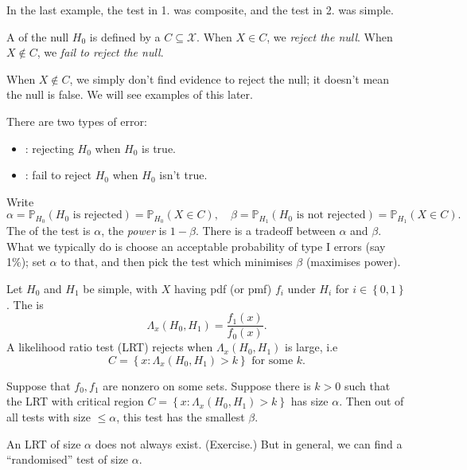 \documentclass[egregdoesnotlikesansseriftitles,a4paper]{scrartcl}
\begin{document}
In the last example, the test in 1. was composite, and the test in 2. was simple.
\begin{definition*}[Test]
      A  of the null $H_0 $ is defined by a  $C \subseteq \mathcal{X}$. When $X \in C$, we \emph{reject the null}. When $X \notin C$, we \emph{fail to reject the null}.
      \begin{remark}
            When $X \notin C$, we simply don't find evidence to reject the null; it doesn't mean the null is false. We will see examples of this later.
      \end{remark}
\end{definition*}
\begin{definition*}[Error]
     There are two types of error:
     \begin{itemize}
          \item {}: rejecting $H_0 $ when $H_0 $ is true.
          \item {}: fail to reject $H_0 $ when $H_0 $ isn't true.
     \end{itemize}
\end{definition*}
Write \[
     \alpha =\mathbb{P}_{H_{0}}(H_0 \text{ is rejected} )=\mathbb{P}_{H_{0}} (X \in C), \quad \beta  =\mathbb{P}_{H_{1}}(H_0 \text{ is not rejected} )=\mathbb{P}_{H_{1}} (X \in C)
.\] The  of the test is $\alpha $, the \emph{power} is $1-\beta $. There is a tradeoff between $\alpha $ and $\beta $. What we typically do is choose an acceptable probability of type I errors (say 1\%); set $\alpha $ to that, and then pick the test which minimises $\beta $ (maximises power).
\begin{definition*}
      Let $H_0 $ and $H_1 $ be simple, with $X$ having pdf (or pmf) $f_{i}$ under $H_{i}$ for $i \in \left\{0,1\right\}$. The  is \[
      \Lambda_{x} (H_0 ,H_1 )= \frac{f_1 (x)}{f_0 (x)}
      .\] A likelihood ratio test (LRT) rejects when $\Lambda_{x} (H_0 ,H_1 )$ is large, i.e \[
      C= \left\{x: \Lambda_{x} (H_0 ,H_1 ) >k\right\} \text{ for some } k
      .\] 
\end{definition*}
\begin{theorem}
      Suppose that $f_0 ,f_1 $ are nonzero on some sets. Suppose there is $k >0$ such that the LRT with critical region $C= \left\{x: \Lambda_{x} (H_0 ,H_1 ) >k\right\}$ has size $\alpha $. Then out of all tests with size $\leq  \alpha $, this test has the smallest $\beta $. 
      \begin{remark}
            An LRT of size $\alpha $ does not always exist. (Exercise.) But in general, we can find a ``randomised'' test of size $\alpha $.
      \end{remark}
\end{theorem}
\end{document}
